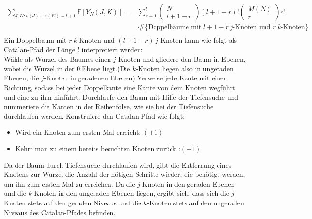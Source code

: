 \documentclass[a4paper, 11pt]{scrreprt}
\newcommand{\EE}{\mathbb{E}}
\begin{document}
\begin{equation}
	\begin{split}
	\sum_{J,K: v(J)+v(K) = l+1} \EE[Y_N(J,K)] = &\sum_{r=1}^{l}\begin{pmatrix} N\\ l+1-r\end{pmatrix} (l+1-r)! \begin{pmatrix} M(N)\\r\end{pmatrix} r! \\
	&\cdot \#\{\text{Doppelbäume mit }l+1-r\ j\text{-Knoten und } r\ k\text{-Knoten}\} \\
	\end{split}
\end{equation}
Ein Doppelbaum mit \(r\  k\)-Knoten und \((l+1-r)\ j\)-Knoten kann wie folgt als Catalan-Pfad der Länge \(l\) interpretiert werden:\\
Wähle als Wurzel des Baumes einen \(j\)-Knoten und gliedere den Baum in Ebenen, wobei die Wurzel in der 0.Ebene liegt.(Die \(k\)-Knoten liegen also in ungeraden Ebenen, die \(j\)-Knoten in geradenen Ebenen) Verweise jede Kante mit einer Richtung, sodass bei jeder Doppelkante eine Kante von dem Knoten wegführt und eine zu ihm hinführt. Durchlaufe den Baum mit Hilfe der Tiefensuche und nummeriere die Kanten in der Reihenfolge, wie sie bei der Tiefensuche durchlaufen werden. Konstruiere den Catalan-Pfad wie folgt:\\
\begin{itemize}
	\item Wird ein Knoten zum ersten Mal erreicht: \((+1)\)
	\item Kehrt man zu einem bereits besuchten Knoten zurück :\((-1)\)
	
\end{itemize}
Da der Baum durch Tiefensuche durchlaufen wird, gibt die Entfernung eines Knotens zur Wurzel die Anzahl der nötigen Schritte wieder, die benötigt werden, um ihn zum ersten Mal zu erreichen. Da die \(j\)-Knoten in den geraden Ebenen und die \(k\)-Knoten in den ungeraden Ebenen liegen, ergibt sich, dass sich die \(j\)-Knoten stets auf den geraden Niveaus und die \(k\)-Knoten stets auf den ungeraden Niveaus des Catalan-Pfades befinden. 
\end{document}
